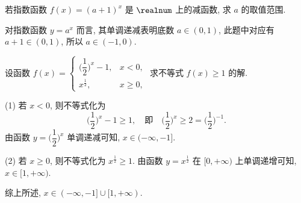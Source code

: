 \begin{example}
    若指数函数 $f(x)=(a+1)^x$ 是 $\realnum$ 上的减函数, 求 $a$ 的取值范围.
\end{example}
\begin{solution}
    对指数函数 $y=a^x$ 而言, 其单调递减表明底数 $a\in(0,1)$, 此题中对应有 $a+1\in(0,1)$, 所以 $a\in(-1,0)$.
\end{solution}

\begin{example}
    设函数 $f(x)=\begin{cases}
        \biggl(\dfrac12\biggr)^x-1, & x<0,\\
        x^{\frac12}, & x\geqslant 0,
    \end{cases}$ 求不等式 $f(x)\geqslant 1$ 的解.
\end{example}
\begin{solution}
    (1) 若 $x<0$, 则不等式化为 
    \[\biggl(\frac12\biggr)^x-1\geqslant 1,\quad \text{即}\quad
        \biggl(\frac12\biggr)^x\geqslant 2= \biggl(\frac12\biggr)^{-1}.\]
    由函数 $y=\biggl(\dfrac12\biggr)^x$ 单调递减可知, $x\in(-\infty,-1]$.
    
    (2) 若 $x\geqslant 0$, 则不等式化为 $x^{\frac12}\geqslant 1$. 由函数 $y=x^{\frac12}$ 在 $[0,+\infty)$ 上单调递增可知, $x\in[1,+\infty)$.
    
    综上所述, $x\in(-\infty,-1]\cup [1,+\infty)$.
\end{solution}